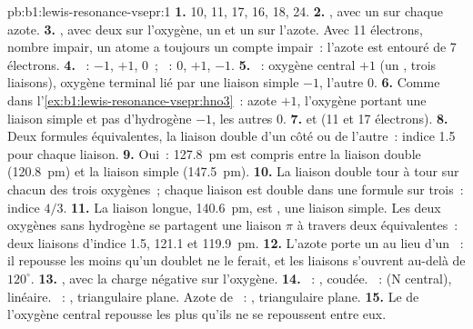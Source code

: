 \begin{solution}{pb:b1:lewis-resonance-vsepr:1}
\textbf{1.}  10,  11,  17,  16,  18,
 24.
\textbf{2.} , avec un  sur chaque azote.
\textbf{3.} , avec deux  sur l'oxygène, un
 et un  sur l'azote. Avec 11
électrons, nombre impair, un atome a toujours un compte impair~: l'azote
est entouré de 7 électrons.
\textbf{4.} ~: $-1$, $+1$, $0$~; ~: $0$, $+1$, $-1$.
\textbf{5.} ~: oxygène central $+1$ (un , trois
liaisons), oxygène terminal lié par une liaison simple $-1$, l'autre 0.
\textbf{6.} Comme dans l'\cref{ex:b1:lewis-resonance-vsepr:hno3}~: azote
$+1$, l'oxygène portant une liaison simple et pas d'hydrogène $-1$, les
autres 0.
\textbf{7.}  et  (11 et 17 électrons).
\textbf{8.} Deux formules équivalentes, la liaison double d'un côté ou de
l'autre~: indice 1.5 pour chaque liaison.
\textbf{9.} Oui~: \qty{127.8}{pm} est compris entre la liaison double
(\qty{120.8}{pm}) et la liaison simple (\qty{147.5}{pm}).
\textbf{10.} La liaison double tour à tour sur chacun des trois oxygènes~;
chaque liaison  est double dans une formule sur trois~: indice
$4/3$.
\textbf{11.} La liaison longue, \qty{140.6}{pm}, est , une
liaison simple. Les deux oxygènes sans hydrogène se partagent une liaison
$\pi$ à travers deux  équivalentes~: deux liaisons
d'indice 1.5, 121.1 et \qty{119.9}{pm}.
\textbf{12.} L'azote porte un  au lieu d'un ~: il repousse les  moins qu'un doublet ne le
ferait, et les liaisons s'ouvrent au-delà de $120^\circ$.
\textbf{13.} , avec la charge négative sur l'oxygène.
\textbf{14.} ~: , coudée. ~:  (N central),
linéaire. ~: , triangulaire plane. Azote de ~:
, triangulaire plane.
\textbf{15.} Le  de l'oxygène central repousse les
 plus qu'ils ne se repoussent entre eux.

\end{solution}
